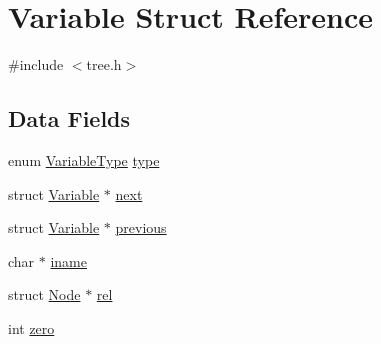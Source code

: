\hypertarget{struct_variable}{\section{Variable Struct Reference}
\label{struct_variable}
}


{\ttfamily \#include $<$tree.\-h$>$}

\subsection*{Data Fields}
\begin{DoxyCompactItemize}
\item 
enum \hyperlink{tree_8h_ac62972ff1b21a037e56530cde67309ab}{Variable\-Type} \hyperlink{struct_variable_a6d3af05ac5e896c45aeb8834fcbf84f4}{type}
\item 
struct \hyperlink{struct_variable}{Variable} $\ast$ \hyperlink{struct_variable_ac6387180163bef05cf8ea37a4fbd0682}{next}
\item 
struct \hyperlink{struct_variable}{Variable} $\ast$ \hyperlink{struct_variable_ad27df2f2e773678c5804cc233343aed1}{previous}
\item 
char $\ast$ \hyperlink{struct_variable_a76c70ae7ac3d58ebe41da968fedb8093}{iname}
\item 
struct \hyperlink{struct_node}{Node} $\ast$ \hyperlink{struct_variable_adf9b74cb9b4f3a80e8af89e50bd11975}{rel}
\item 
int \hyperlink{struct_variable_a627f44b64b5d8d3ae8cb6a675f164405}{zero}
\end{DoxyCompactItemize}



